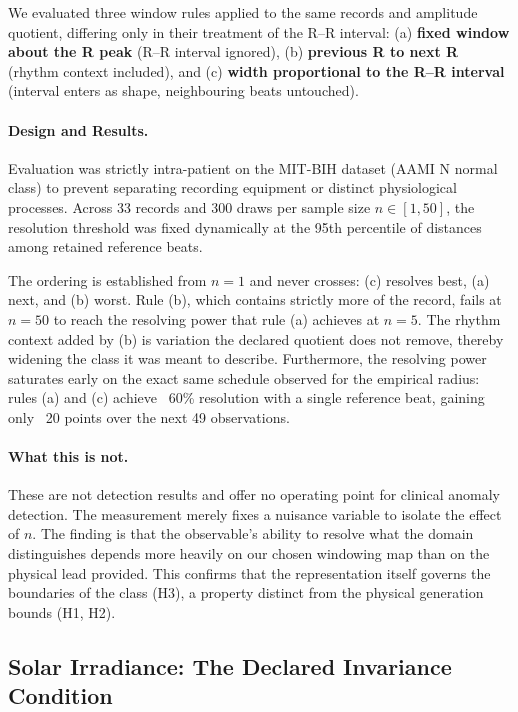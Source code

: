 \documentclass[10pt]{article}
\theoremstyle{plain}
\theoremstyle{definition}
\theoremstyle{remark}
\begin{document}
We evaluated three window rules applied to the same records and amplitude quotient, differing only in their treatment of the R--R interval: (a) \textbf{fixed window about the R peak} (R--R interval ignored), (b) \textbf{previous R to next R} (rhythm context included), and (c) \textbf{width proportional to the R--R interval} (interval enters as shape, neighbouring beats untouched). 

\paragraph{Design and Results.}
Evaluation was strictly intra-patient on the MIT-BIH dataset (AAMI N normal class) to prevent separating recording equipment or distinct physiological processes. Across 33 records and 300 draws per sample size $n \in [1, 50]$, the resolution threshold was fixed dynamically at the 95th percentile of distances among retained reference beats.

The ordering is established from $n=1$ and never crosses: (c) resolves best, (a) next, and (b) worst. Rule (b), which contains strictly more of the record, fails at $n=50$ to reach the resolving power that rule (a) achieves at $n=5$. The rhythm context added by (b) is variation the declared quotient does not remove, thereby widening the class it was meant to describe. Furthermore, the resolving power saturates early on the exact same schedule observed for the empirical radius: rules (a) and (c) achieve ~60\% resolution with a single reference beat, gaining only ~20 points over the next 49 observations.

\paragraph{What this is not.} 
These are not detection results and offer no operating point for clinical anomaly detection. The measurement merely fixes a nuisance variable to isolate the effect of $n$. The finding is that the observable's ability to resolve what the domain distinguishes depends more heavily on our chosen windowing map than on the physical lead provided. This confirms that the representation itself governs the boundaries of the class (H3), a property distinct from the physical generation bounds (H1, H2).

\subsection{Solar Irradiance: The Declared Invariance Condition}
\label{sec:results-solar}
\end{document}
